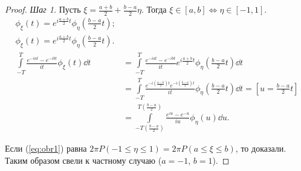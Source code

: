 \begin{proof}
\textsl{Шаг 1.} Пусть $\xi = \frac{a+b}{2} + \frac{b - a}{2}\eta$.
    Тогда $\xi\in [a, b] \iff\eta\in [-1, 1]$.
   \begin{align*}
   \phi_\xi(t) = e^{i\frac{a + b}{2}t}\phi_\eta(\frac{b-a}{2}t);\\
   \phi_\xi(t) = e^{i\frac{a + b}{2}t}\phi_\eta(\frac{b-a}{2}t).\\
       \int\limits_{-T}^T \frac{e^{-iat} -e^{-ibt}}{it}\phi_\xi(t)\dd t &= \int\limits_{-T}^T \frac{e^{-iat} -e^{-ibt}}{it}e^{i\frac{a + b}{2}t}\phi_\eta(\frac{b-a}{2}t)\dd t \\&=\int\limits_{-T}^T \frac{e^{-i(\frac{a-b}{2})t}e^{-i(\frac{b-a}{2})t}}{it}\phi_\eta(\frac{b-a}{2}t)\dd t = [u = \frac{b-a}{2}t] \\ &= \int\limits_{-T(\frac{b-a}{2})}^{T(\frac{b -a}{2})}\frac{e^{iu} - e^{-u}}{iu}\phi_\eta(u)\dd u. \label{eq:obr1}\tag{$*$}
   \end{align*}
  
Если (\ref{eq:obr1}) равна $2\pi P(-1\le \eta \le 1) = 2\pi P(a\le \xi\le b)$, то доказали. Таким образом свели к частному случаю ($a=-1$, $b=1$).



\end{proof}

